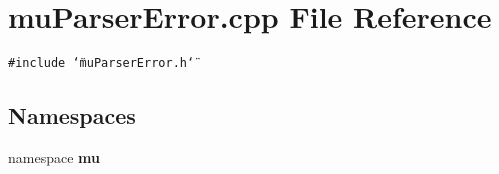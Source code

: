 \section{muParserError.cpp File Reference}
\label{muParserError_8cpp}


{\tt \#include \char`\"{}muParserError.h\char`\"{}}\par
\subsection*{Namespaces}
\begin{CompactItemize}
\item 
namespace {\bf mu}
\end{CompactItemize}
